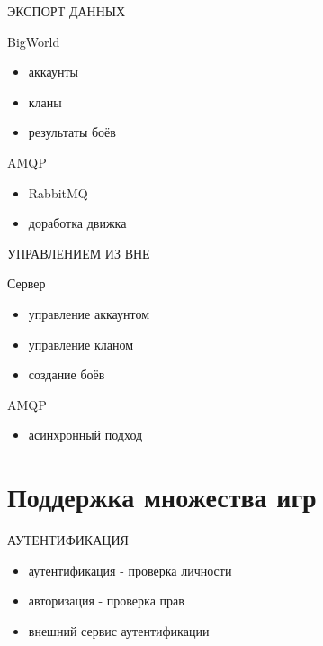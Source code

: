 \documentclass[aspectratio=169]{beamer}
\begin{document}
\begin{frame}{ЭКСПОРТ ДАННЫХ}
    \begin{block}{BigWorld}
        \begin{itemize}
            \item{аккаунты}
            \item{кланы}
            \item{результаты боёв}
        \end{itemize}
    \end{block}

    \begin{block}{AMQP}
        \begin{itemize}
            \item{RabbitMQ}
            \item{доработка движка}
        \end{itemize}
    \end{block}
\end{frame}

\begin{frame}{УПРАВЛЕНИЕМ ИЗ ВНЕ}
    \begin{block}{Сервер}
        \begin{itemize}
            \item управление аккаунтом
            \item управление кланом
            \item создание боёв
        \end{itemize}
    \end{block}

    \begin{block}{AMQP}
        \begin{itemize}
            \item асинхронный подход
        \end{itemize}
    \end{block}
\end{frame}

\section{Поддержка множества игр}
\begin{frame}{АУТЕНТИФИКАЦИЯ}
    \begin{itemize}
        \item аутентификация - проверка личности
        \item авторизация - проверка прав
        \item внешний сервис аутентификации
    \end{itemize}
\end{frame}
\end{document}
